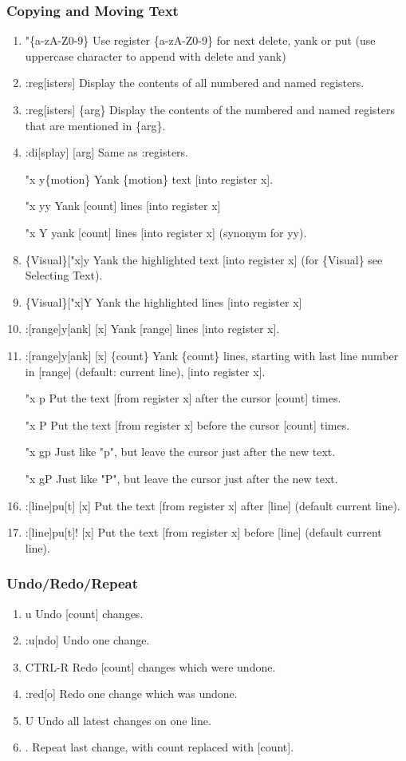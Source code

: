 \documentclass{beamer}
\begin{document}
\begin{frame}
  \frametitle{Copying and Moving Text}

  \begin{enumerate}
    \item "\{a-zA-Z0-9\} 	Use register \{a-zA-Z0-9\} for next delete, yank or put (use uppercase character to append with delete and yank)
    \item :reg[isters] 	Display the contents of all numbered and named registers.
    \item :reg[isters] \{arg\} 	Display the contents of the numbered and named registers that are mentioned in \{arg\}.
    \item :di[splay] [arg] 	Same as :registers.
    \item ["x]y\{motion\} 	Yank \{motion\} text [into register x].
    \item ["x]yy 	Yank [count] lines [into register x]
    \item ["x]Y 	yank [count] lines [into register x] (synonym for yy).
    \item \{Visual\}["x]y 	Yank the highlighted text [into register x] (for \{Visual\} see Selecting Text).
    \item \{Visual\}["x]Y 	Yank the highlighted lines [into register x]
    \item :[range]y[ank] [x] 	Yank [range] lines [into register x].
    \item :[range]y[ank] [x] \{count\} 	Yank \{count\} lines, starting with last line number in [range] (default: current line), [into register x].
    \item ["x]p 	Put the text [from register x] after the cursor [count] times.
    \item ["x]P 	Put the text [from register x] before the cursor [count] times.
    \item ["x]gp 	Just like "p", but leave the cursor just after the new text.
    \item ["x]gP 	Just like "P", but leave the cursor just after the new text.
    \item :[line]pu[t] [x] 	Put the text [from register x] after [line] (default current line).
    \item :[line]pu[t]! [x] 	Put the text [from register x] before [line] (default current line).
  \end{enumerate}
\end{frame}

\begin{frame}
  \frametitle{Undo/Redo/Repeat}

  \begin{enumerate}
    \item u 	Undo [count] changes.
    \item :u[ndo] 	Undo one change.
    \item CTRL-R 	Redo [count] changes which were undone.
    \item :red[o] 	Redo one change which was undone.
    \item U 	Undo all latest changes on one line.
    \item . 	Repeat last change, with count replaced with [count].
  \end{enumerate}
\end{frame}
\end{document}
